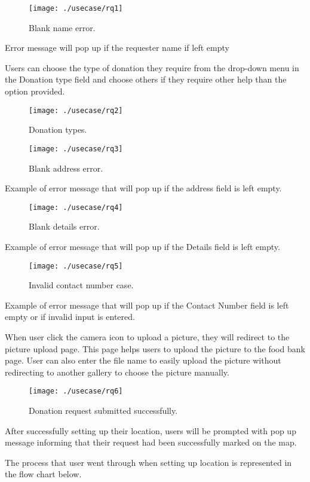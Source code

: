 \documentclass[conference]{IEEEtran}
\begin{document}
\begin{figure}[h!]
\texttt{[image: ./usecase/rq1]}
\centering
\caption{Blank name error.}
\end{figure}

Error message will pop up if the requester name if left empty


Users can choose the type of donation they require from the drop-down menu in the Donation type field and choose others if they require other help than the option provided.

\begin{figure}[h!]
\texttt{[image: ./usecase/rq2]}
\centering
\caption{Donation types.}
\end{figure}

\begin{figure}[h!]
\texttt{[image: ./usecase/rq3]}
\centering
\caption{Blank address error.}
\end{figure}

Example of error message that will pop up if the address field is left empty.
\begin{figure}[h!]
\texttt{[image: ./usecase/rq4]}
\centering
\caption{Blank details error.}
\end{figure}

Example of error message that will pop up if the Details field is left empty.
\begin{figure}[h!]
\texttt{[image: ./usecase/rq5]}
\centering
\caption{Invalid contact number case.}
\end{figure}
Example of error message that will pop up if the Contact Number field is left empty or if invalid input is entered.

When user click the camera icon to upload a picture, they will redirect to the picture upload page. This page helps users to upload the picture to the food bank page. User can also enter the file name to easily upload the picture without redirecting to another gallery to choose the picture manually.

\begin{figure}[h!]
\texttt{[image: ./usecase/rq6]}
\centering
\caption{Donation request submitted successfully.}
\end{figure}

After successfully setting up their location, users will be prompted with pop up message informing that their request had been successfully marked on the map.

The process that user went through when setting up location is represented in the flow chart below.
\end{document}
